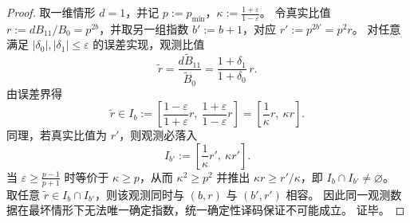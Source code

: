 \begin{proof}
取一维情形 \(d=1\)，并记 \(p:=p_{\min}\)，\(\kappa:=\frac{1+\varepsilon}{1-\varepsilon}\)。
令真实比值 \(r:=dB_{11}/B_0=p^{2b}\)，并取另一组指数 \(b':=b+1\)，对应 \(r':=p^{2b'}=p^2r\)。
对任意满足 \(|\delta_0|,|\delta_1|\le\varepsilon\) 的误差实现，观测比值
\[
\widetilde r=\frac{d\widetilde B_{11}}{\widetilde B_0}
=\frac{1+\delta_1}{1+\delta_0}\,r.
\]
由误差界得
\[
\widetilde r\in I_b:=\left[\frac{1-\varepsilon}{1+\varepsilon}r,\ \frac{1+\varepsilon}{1-\varepsilon}r\right]
=\left[\frac{1}{\kappa}r,\ \kappa r\right].
\]
同理，若真实比值为 \(r'\)，则观测必落入
\[
I_{b'}:=\left[\frac{1}{\kappa}r',\ \kappa r'\right].
\]
当 \(\varepsilon\ge \frac{p-1}{p+1}\) 时等价于 \(\kappa\ge p\)，从而 \(\kappa^2\ge p^2\) 并推出 \(\kappa r\ge r'/\kappa\)，即 \(I_b\cap I_{b'}\neq\varnothing\)。
取任意 \(\widetilde r\in I_b\cap I_{b'}\)，则该观测同时与 \((b,r)\) 与 \((b',r')\) 相容。
因此同一观测数据在最坏情形下无法唯一确定指数，统一确定性译码保证不可能成立。
证毕。
\end{proof}

\endinput
